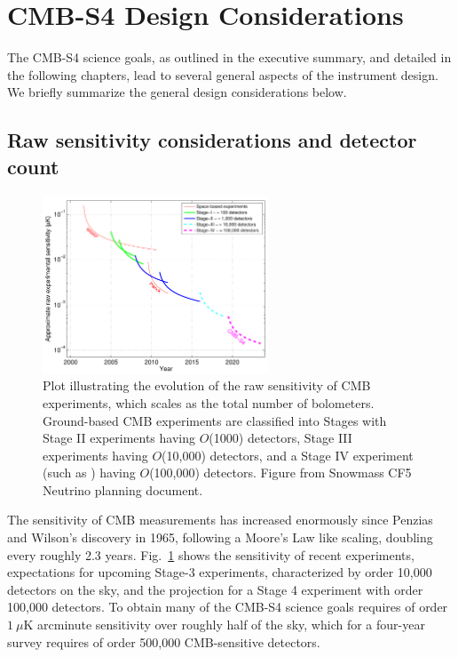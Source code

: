 \section{CMB-S4 Design Considerations}

The CMB-S4 science goals, as outlined in the executive summary, and detailed in the following chapters, lead to several general aspects of the instrument design. We briefly summarize the general design considerations below.



\subsection{Raw sensitivity considerations and detector count}

\begin{figure}[t]
\centering \includegraphics[width=0.6\textwidth]{Intro/expt_progress.pdf}
\caption{Plot illustrating the evolution of the raw sensitivity of CMB
  experiments, which scales as the total number of
  bolometers. Ground-based CMB experiments are classified into Stages
  with Stage II experiments having $O$(1000) detectors, Stage III
  experiments having $O$(10,000) detectors, and a Stage IV experiment
  (such as \cmbexp) having $O$(100,000) detectors. Figure from Snowmass  CF5
  Neutrino planning document.}
\label{fig:expt_progress-intro}
\end{figure}

The sensitivity of CMB measurements has increased enormously since Penzias and Wilson's discovery in 1965, following a Moore's Law like scaling, doubling every roughly 2.3 years. Fig.~\ref{fig:expt_progress-intro} shows the sensitivity of recent experiments, expectations for upcoming Stage-3 experiments, characterized by order 10,000 detectors on the sky, and the projection for a Stage 4 experiment with order 100,000 detectors. To obtain many of the CMB-S4 science goals requires of order $1~\mu$K arcminute sensitivity over roughly half of the sky, which for a four-year survey requires of order 500,000 CMB-sensitive detectors. 


